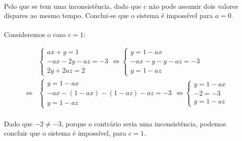 \paragraph{}Pelo que se tem uma inconsistência, dado que $c$ não pode assumir
dois valores díspares ao mesmo tempo. Conclui-se que o sistema é impossível
para $a = 0$.

\paragraph{}Consideremos o caso $c = 1$:

\begin{align*}
	&
	\begin{cases}
		ax + y = 1\\
		-ax -2y -az = -3\\
		2y + 2az = 2
	\end{cases}
	\iff 
	\begin{cases}
		y = 1 - ax\\
		-ax -y -y -az = -3\\
		y = 1 - az
	\end{cases}\\
	\iff
	&
	\begin{cases}
		y = 1 - ax\\
		-ax -(1 - ax) -(1 - az) -az = -3\\
		y = 1 - az
	\end{cases}
	\iff
	\begin{cases}
		y = 1 - ax\\
		-2 = -3\\
		y = 1 - az
	\end{cases}
\end{align*}

\paragraph{}Dado que $-2 \neq -3$, porque o contrário seria uma
inconsistência, podemos concluir que o sistema é impossível, para $c = 1$.

